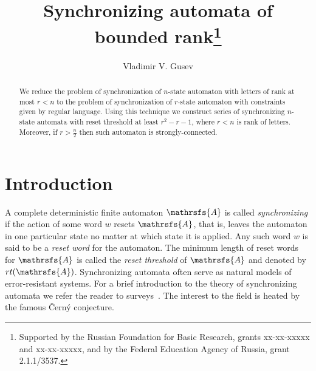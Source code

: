 \documentclass[11pt]{llncs}
\newcommand{\sa}{synchronizing automata}
\newcommand{\rl}{reset threshold}
\newcommand{\rt}{rt}
\begin{document}
\title{Synchronizing automata of bounded rank\thanks{Supported
by the Russian Foundation for Basic Research, grants xx-xx-xxxxx
and xx-xx-xxxxx, and by the Federal Education Agency of Russia,
grant 2.1.1/3537.}}


\author{Vladimir V. Gusev}




\maketitle

\begin{abstract}
We reduce the problem of synchronization of $n$-state automaton
with letters of rank at most $r < n$ 
to the problem of synchronization of $r$-state 
automaton with constraints given by regular language.
Using this technique we construct series of synchronizing
$n$-state automata with reset threshold at least $r^2 -r - 1$,
where $r < n$ is rank of letters.
Moreover, if $r > \frac{n}{2}$ then such automaton is strongly-connected.
\end{abstract}

\section{Introduction}
A complete deterministic finite automaton $\mathrsfs{A}$ is called
\emph{synchronizing} if the action of some word $w$ resets $\mathrsfs{A}$, that
is, leaves the automaton in one particular state no matter at which state it is
applied. Any such word $w$ is said to be a \emph{reset word} for the automaton.
The minimum length of reset words for $\mathrsfs{A}$ is called the \emph{\rl}
of $\mathrsfs{A}$ and denoted by $\rt(\mathrsfs{A})$. Synchronizing automata
often serve as natural models of error-resistant
systems. For a brief introduction to the theory of synchronizing automata we refer
the reader to surveys~\cite{Sa05,Vo08}. 
The interest to the field is
heated by the famous \v{C}ern\'{y} conjecture.
\end{document}
